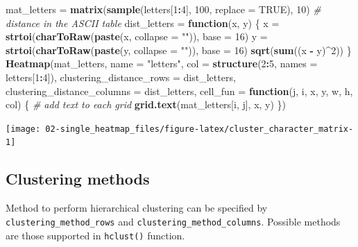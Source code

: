 \documentclass[]{book}
\newenvironment{Shaded}{\begin{snugshade}}{\end{snugshade}}
\newcommand{\KeywordTok}[1]{\textcolor[rgb]{0.13,0.29,0.53}{\textbf{#1}}}
\newcommand{\DataTypeTok}[1]{\textcolor[rgb]{0.13,0.29,0.53}{#1}}
\newcommand{\DecValTok}[1]{\textcolor[rgb]{0.00,0.00,0.81}{#1}}
\newcommand{\StringTok}[1]{\textcolor[rgb]{0.31,0.60,0.02}{#1}}
\newcommand{\CommentTok}[1]{\textcolor[rgb]{0.56,0.35,0.01}{\textit{#1}}}
\newcommand{\OtherTok}[1]{\textcolor[rgb]{0.56,0.35,0.01}{#1}}
\newcommand{\ControlFlowTok}[1]{\textcolor[rgb]{0.13,0.29,0.53}{\textbf{#1}}}
\newcommand{\OperatorTok}[1]{\textcolor[rgb]{0.81,0.36,0.00}{\textbf{#1}}}
\newcommand{\NormalTok}[1]{#1}
\theoremstyle{definition}
\theoremstyle{definition}
\theoremstyle{definition}
\theoremstyle{remark}
\begin{document}
\begin{Shaded}
\begin{Highlighting}[]
\NormalTok{mat_letters =}\StringTok{ }\KeywordTok{matrix}\NormalTok{(}\KeywordTok{sample}\NormalTok{(letters[}\DecValTok{1}\OperatorTok{:}\DecValTok{4}\NormalTok{], }\DecValTok{100}\NormalTok{, }\DataTypeTok{replace =} \OtherTok{TRUE}\NormalTok{), }\DecValTok{10}\NormalTok{)}
\CommentTok{# distance in the ASCII table}
\NormalTok{dist_letters =}\StringTok{ }\ControlFlowTok{function}\NormalTok{(x, y) \{}
\NormalTok{    x =}\StringTok{ }\KeywordTok{strtoi}\NormalTok{(}\KeywordTok{charToRaw}\NormalTok{(}\KeywordTok{paste}\NormalTok{(x, }\DataTypeTok{collapse =} \StringTok{""}\NormalTok{)), }\DataTypeTok{base =} \DecValTok{16}\NormalTok{)}
\NormalTok{    y =}\StringTok{ }\KeywordTok{strtoi}\NormalTok{(}\KeywordTok{charToRaw}\NormalTok{(}\KeywordTok{paste}\NormalTok{(y, }\DataTypeTok{collapse =} \StringTok{""}\NormalTok{)), }\DataTypeTok{base =} \DecValTok{16}\NormalTok{)}
    \KeywordTok{sqrt}\NormalTok{(}\KeywordTok{sum}\NormalTok{((x }\OperatorTok{-}\StringTok{ }\NormalTok{y)}\OperatorTok{^}\DecValTok{2}\NormalTok{))}
\NormalTok{\}}
\KeywordTok{Heatmap}\NormalTok{(mat_letters, }\DataTypeTok{name =} \StringTok{"letters"}\NormalTok{, }\DataTypeTok{col =} \KeywordTok{structure}\NormalTok{(}\DecValTok{2}\OperatorTok{:}\DecValTok{5}\NormalTok{, }\DataTypeTok{names =}\NormalTok{ letters[}\DecValTok{1}\OperatorTok{:}\DecValTok{4}\NormalTok{]),}
    \DataTypeTok{clustering_distance_rows =}\NormalTok{ dist_letters, }\DataTypeTok{clustering_distance_columns =}\NormalTok{ dist_letters,}
    \DataTypeTok{cell_fun =} \ControlFlowTok{function}\NormalTok{(j, i, x, y, w, h, col) \{ }\CommentTok{# add text to each grid}
        \KeywordTok{grid.text}\NormalTok{(mat_letters[i, j], x, y)}
\NormalTok{    \})}
\end{Highlighting}
\end{Shaded}

\begin{center}\texttt{[image: 02-single\_heatmap\_files/figure-latex/cluster\_character\_matrix-1]} \end{center}

\subsection{Clustering methods}\label{clustering-methods}

Method to perform hierarchical clustering can be specified by
\texttt{clustering\_method\_rows} and
\texttt{clustering\_method\_columns}. Possible methods are those
supported in \texttt{hclust()} function.
\end{document}
